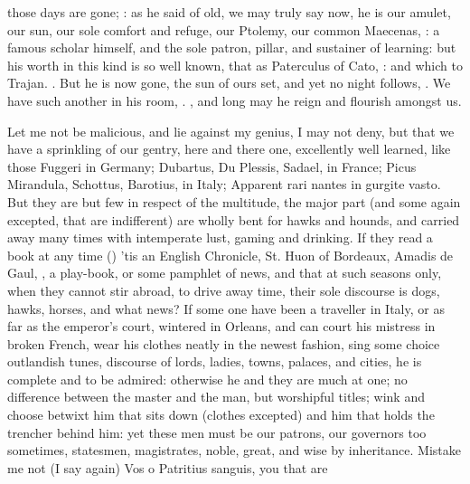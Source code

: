 {those days are gone; : as he said of old, we may truly say now, he is
our amulet, our sun, our sole comfort and refuge, our Ptolemy, our common
Maecenas, : a famous scholar himself,
and the sole patron, pillar, and sustainer of learning: but his worth
in this kind is so well known, that as Paterculus of Cato, : and which \Pliny{} to Trajan. . But he is now gone, the sun of ours set, and yet no night
follows, . We have such another in
his room, . ,
and long may he reign and flourish amongst us.

Let me not be malicious, and lie against my genius, I may not deny, but
that we have a sprinkling of our gentry, here and there one,
excellently well learned, like those Fuggeri in Germany; Dubartus, Du
Plessis, Sadael, in France; Picus Mirandula, Schottus, Barotius, in
Italy; Apparent rari nantes in gurgite vasto. But they are but few in
respect of the multitude, the major part (and some again excepted, that
are indifferent) are wholly bent for hawks and hounds, and carried away
many times with intemperate lust, gaming and drinking. If they read a
book at any time () 'tis an English Chronicle, St. Huon of Bordeaux, Amadis de
Gaul, \etc{}, a play-book, or some pamphlet of news, and that at such
seasons only, when they cannot stir abroad, to drive away time,
their sole discourse is dogs, hawks, horses, and what news? If
some one have been a traveller in Italy, or as far as the emperor's
court, wintered in Orleans, and can court his mistress in broken
French, wear his clothes neatly in the newest fashion, sing some choice
outlandish tunes, discourse of lords, ladies, towns, palaces, and
cities, he is complete and to be admired: otherwise he and they
are much at one; no difference between the master and the man, but
worshipful titles; wink and choose betwixt him that sits down (clothes
excepted) and him that holds the trencher behind him: yet these men
must be our patrons, our governors too sometimes, statesmen,
magistrates, noble, great, and wise by inheritance.
Mistake me not (I say again) Vos o Patritius sanguis, you that are

}
